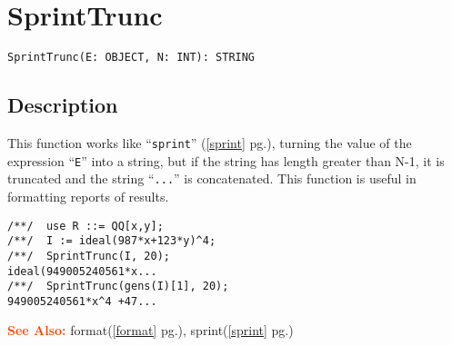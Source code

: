 \documentclass[a4paper]{mybook}
\newenvironment{command}{}{} %
\newcommand\SeeAlso{\par\textcolor{OrangeRed}{\textbf{\large See Also: }}}
\begin{document}
\section{SprintTrunc}
\label{SprintTrunc}
\begin{command} %


\begin{Verbatim}[label=syntax, rulecolor=\color{MidnightBlue},
frame=single]
SprintTrunc(E: OBJECT, N: INT): STRING
\end{Verbatim}


\subsection*{Description}

This function works like ``\verb&sprint&'' (\ref{sprint} pg.\pageref{sprint}), turning the value of the
expression ``\verb&E&'' into a string, but if the string has length greater than
N-1, it is truncated and the string ``\verb&...&'' is concatenated.  This
function is useful in formatting reports of results.
\begin{Verbatim}[label=example, rulecolor=\color{PineGreen}, frame=single]
/**/  use R ::= QQ[x,y];
/**/  I := ideal(987*x+123*y)^4;
/**/  SprintTrunc(I, 20);
ideal(949005240561*x...
/**/  SprintTrunc(gens(I)[1], 20);
949005240561*x^4 +47...
\end{Verbatim}


\SeeAlso %
  format(\ref{format} pg.\pageref{format}), 
    sprint(\ref{sprint} pg.\pageref{sprint})
\end{command} %
\end{document}
